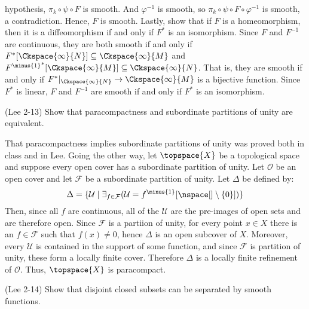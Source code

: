 \begin{solution}
        hypothesis, $\pi_{k}\circ\psi\circ{F}$ is smooth. And
        $\varphi^{\minus{1}}$ is smooth, so
        $\pi_{k}\circ\psi\circ{F}\circ\varphi^{\minus{1}}$ is smooth,
        a contradiction. Hence, $F$ is smooth. Lastly, show that if $F$ is a
        homeomorphism, then it is a diffeomorphism if and only if $F^{*}$ is
        an isomorphism. Since $F$ and $F^{\minus{1}}$ are continuous, they
        are both smooth if and only if
        $F^{*}[\Ckspace{\infty}{N}]\subseteq\Ckspace{\infty}{M}$ and
        ${F^{\minus{1}}}^{*}[\Ckspace{\infty}{M}]%
         \subseteq\Ckspace{\infty}{N}$. That is, they are smooth if and only
        if $F^{*}|_{\Ckspace{\infty}{N}}\rightarrow\Ckspace{\infty}{M}$ is a
        bijective function. Since $F^{*}$ is linear, $F$ and $F^{\minus{1}}$
        are smooth if and only if $F^{*}$ is an isomorphism.
    \end{solution}
    \begin{problem}
        (Lee 2-13) Show that paracompactness and subordinate partitions of
        unity are equivalent.
    \end{problem}
    \begin{solution}
        That paracompactness implies subordinate partitions of unity was
        proved both in class and in Lee. Going the other way, let
        $\topspace{X}$ be a topological space and suppose every
        open cover has a subordinate partition of unity. Let $\mathcal{O}$
        be an open cover and let $\mathcal{F}$ be a subordinate partition of
        unity. Let $\Delta$ be defined by:
        \begin{equation}
            \Delta=\{\mathcal{U}\;|\;\exists_{f\in\mathcal{F}}
            (\mathcal{U}=f^{\minus{1}}[\nspace[]\setminus\{0\}])\}
        \end{equation}
        Then, since all $f$ are continuous, all of the $\mathcal{U}$ are the
        pre-images of open sets and are therefore open. Since $\mathcal{F}$
        is a partiion of unity, for every point $x\in{X}$ there is an
        $f\in\mathcal{F}$ such that $f(x)\ne{0}$, hence $\Delta$ is an open
        subcover of $X$. Moreover, every $\mathcal{U}$ is contained in the
        support of some function, and since $\mathcal{F}$ is partition of
        unity, these form a locally finite cover. Therefore $\Delta$ is a
        locally finite refinement of $\mathcal{O}$. Thus, $\topspace{X}$
        is paracompact.
    \end{solution}
    \begin{problem}
        (Lee 2-14) Show that disjoint closed subsets can be separated by
        smooth functions.
    \end{problem}
